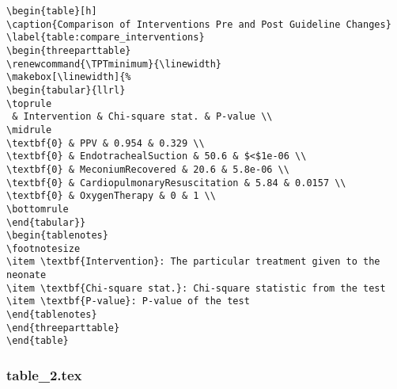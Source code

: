 \documentclass[11pt]{article}
\begin{document}
\begin{Verbatim}[tabsize=4]
\begin{table}[h]
\caption{Comparison of Interventions Pre and Post Guideline Changes}
\label{table:compare_interventions}
\begin{threeparttable}
\renewcommand{\TPTminimum}{\linewidth}
\makebox[\linewidth]{%
\begin{tabular}{llrl}
\toprule
 & Intervention & Chi-square stat. & P-value \\
\midrule
\textbf{0} & PPV & 0.954 & 0.329 \\
\textbf{0} & EndotrachealSuction & 50.6 & $<$1e-06 \\
\textbf{0} & MeconiumRecovered & 20.6 & 5.8e-06 \\
\textbf{0} & CardiopulmonaryResuscitation & 5.84 & 0.0157 \\
\textbf{0} & OxygenTherapy & 0 & 1 \\
\bottomrule
\end{tabular}}
\begin{tablenotes}
\footnotesize
\item \textbf{Intervention}: The particular treatment given to the neonate
\item \textbf{Chi-square stat.}: Chi-square statistic from the test
\item \textbf{P-value}: P-value of the test
\end{tablenotes}
\end{threeparttable}
\end{table}

\end{Verbatim}

\subsubsection*{table\_2.tex}
\end{document}

